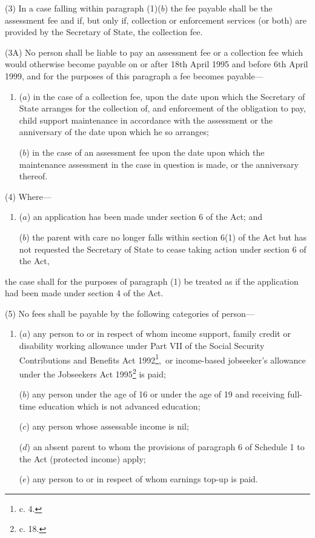 \documentclass[a4paper]{article}
\begin{document}

(3) In a case falling within paragraph (1)($b$) the fee payable shall be the assessment fee and if, but only if, collection or enforcement services (or both) are provided by the Secretary of State, the collection fee.

(3A) No person shall be liable to pay an assessment fee or a collection fee which would otherwise become payable on or after 18th April 1995 and before 6th April 
1999,  %
and for the purposes of this paragraph a fee becomes payable—
\begin{enumerate}\item[]
($a$) in the case of a collection fee, upon the date upon which the Secretary of State arranges for the collection of, and enforcement of the obligation to pay, child support maintenance in accordance with the assessment or the anniversary of the date upon which he so arranges;

($b$) in the case of an assessment fee upon the date upon which the maintenance assessment in the case in question is made, or the anniversary thereof.
\end{enumerate}

(4) Where—
\begin{enumerate}\item[]
($a$) an application has been made under section 6 of the Act; and

($b$) the parent with care no longer falls within section 6(1) of the Act but has not requested the Secretary of State to cease taking action under section 6 of the Act,
\end{enumerate}
the case shall for the purposes of paragraph (1) be treated as if the application had been made under section 4 of the Act.

(5) No fees shall be payable by the following categories of person—
\begin{enumerate}\item[]
($a$) any person to or in respect of whom income support, family credit or disability working allowance under Part VII of the Social Security Contributions and Benefits Act 1992\footnote{ c. 4.},~or income-based jobseeker’s allowance under the Jobseekers Act 1995\footnote{ c. 18.} is paid;

($b$) any person under the age of 16 or under the age of 19 and receiving full-time education which is not advanced education;

($c$) any person whose assessable income is nil;

($d$) an absent parent to whom the provisions of paragraph 6 of Schedule 1 to the Act (protected income) apply;

($e$) any person to or in respect of whom earnings top-up is paid.
\end{enumerate}
\end{document}
